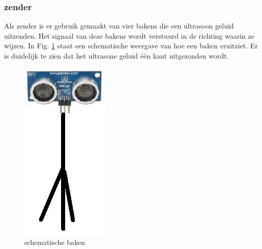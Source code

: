 \documentclass{article}
\begin{document}
\subsubsection{zender}
Als zender is er gebruik gemaakt van vier bakens die een ultrasoon geluid uitzenden. Het signaal van deze bakens wordt verstuurd in de richting waarin ze wijzen. In Fig. \ref{baken} staat een schematische weergave van hoe een baken eruitziet. Er is duidelijk te zien dat het ultrasone geluid \'{e}\'{e}n kant uitgezonden wordt.
\begin{figure}[h]
\centering\includegraphics[scale=0.5]{Ultrasonic-Range-Finderv2.jpg}
\caption{schematische baken}
\label{baken}
\end{figure}
\end{document}
